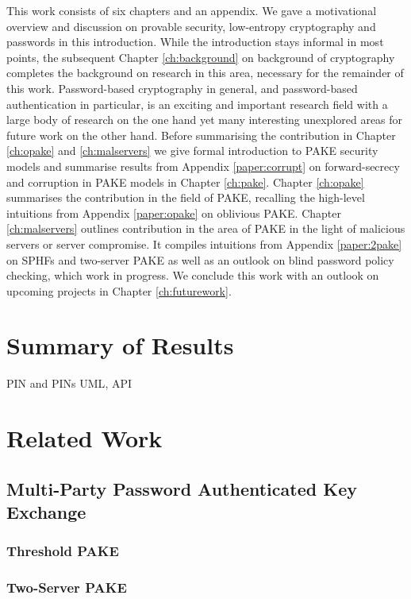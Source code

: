 This work consists of six chapters and an appendix.
We gave a motivational overview and discussion on provable security, low-entropy cryptography and passwords in this introduction.
While the introduction stays informal in most points, the subsequent Chapter \ref{ch:background} on background of cryptography completes the background on research in this area, necessary for the remainder of this work.
Password-based cryptography in general, and password-based authentication in particular, is an exciting and important research field with a large body of research on the one hand yet many interesting unexplored areas for future work on the other hand.
Before summarising the contribution in Chapter \ref{ch:opake} and \ref{ch:malservers} we give formal introduction to \acl{PAKE} security models and summarise results from Appendix \ref{paper:corrupt} on forward-secrecy and corruption in \ac{PAKE} models in Chapter \ref{ch:pake}.
Chapter \ref{ch:opake} summarises the contribution in the field of \acl{PAKE}, \ie recalling the high-level intuitions from Appendix \ref{paper:opake} on oblivious \ac{PAKE}.
Chapter \ref{ch:malservers} outlines contribution in the area of \ac{PAKE} in the light of malicious servers or server compromise.
It compiles intuitions from Appendix \ref{paper:2pake} on \aclp{SPHF} and two-server \ac{PAKE} as well as an outlook on blind password policy checking, which work in progress.
We conclude this work with an outlook on upcoming projects in Chapter \ref{ch:futurework}.


\section{Summary of Results}

\ac{PIN} and \acp{PIN}
\ac{UML}, \ac{API}


\section{Related Work}

\subsection{Multi-Party Password Authenticated Key Exchange}

\subsubsection{Threshold PAKE}

\subsubsection{Two-Server PAKE}
